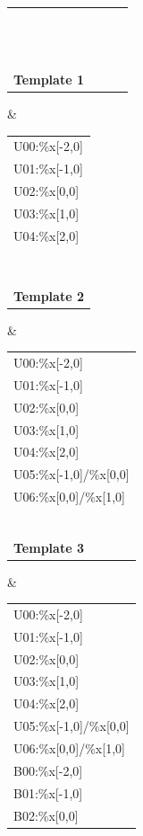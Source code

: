 \documentclass[a4paper,8pt,oneside]{article}
\begin{document}
			\begin{table}[h]
				\begin{tabular}{llll}
					\begin{tabular}[c]{@{}l@{}}U02:\%x{[}0,0{]}\\ \\ \\ \\ \\ \\ \\ \\ \\ \\ \\ \\ \\ \textbf{Template 1}\end{tabular} & \begin{tabular}[c]{@{}l@{}}U00:\%x{[}-2,0{]}\\ U01:\%x{[}-1,0{]}\\ U02:\%x{[}0,0{]}\\ U03:\%x{[}1,0{]}\\ U04:\%x{[}2,0{]}\\ \\ \\ \\ \\ \\ \\ \\ \\ \textbf{Template 2}\end{tabular} & \begin{tabular}[c]{@{}l@{}}U00:\%x{[}-2,0{]}\\ U01:\%x{[}-1,0{]}\\ U02:\%x{[}0,0{]}\\ U03:\%x{[}1,0{]}\\ U04:\%x{[}2,0{]}\\ U05:\%x{[}-1,0{]}/\%x{[}0,0{]}\\ U06:\%x{[}0,0{]}/\%x{[}1,0{]}\\ \\ \\ \\ \\        \\ \\ \textbf{Template 3}\end{tabular} & \begin{tabular}[c]{@{}l@{}}U00:\%x{[}-2,0{]}\\ U01:\%x{[}-1,0{]}\\ U02:\%x{[}0,0{]}\\ U03:\%x{[}1,0{]}\\ U04:\%x{[}2,0{]}\\ U05:\%x{[}-1,0{]}/\%x{[}0,0{]}\\ U06:\%x{[}0,0{]}/\%x{[}1,0{]}\\ B00:\%x{[}-2,0{]}\\ B01:\%x{[}-1,0{]}\\ B02:\%x{[}0,0{]}
\end{tabular}
\end{table}
\end{document}
